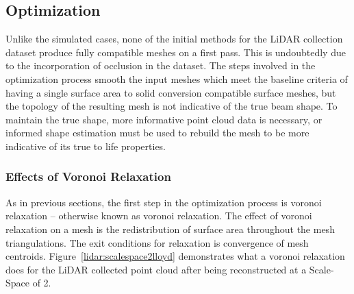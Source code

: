 \documentclass[12pt]{drexelthesis}
\let\Oldsubsection\subsection
\renewcommand{\subsection}{\FloatBarrier\Oldsubsection}
\let\Oldsubsubsection\subsubsection
\renewcommand{\subsubsection}{\FloatBarrier\Oldsubsubsection}
\begin{document}
\subsection{Optimization}

Unlike the simulated cases, none of the initial methods for the LiDAR collection dataset produce fully compatible meshes on a first pass. This is undoubtedly due to the incorporation of occlusion in the dataset. The steps involved in the optimization process smooth the input meshes which meet the baseline criteria of having a single surface area to solid conversion compatible surface meshes, but the topology of the resulting mesh is not indicative of the true beam shape. To maintain the true shape, more informative point cloud data is necessary, or informed shape estimation must be used to rebuild the mesh to be more indicative of its true to life properties.

\subsubsection{Effects of Voronoi Relaxation}

As in previous sections, the first step in the optimization process is voronoi relaxation -- otherwise known as voronoi relaxation. The effect of voronoi relaxation on a mesh is the redistribution of surface area throughout the mesh triangulations. The exit conditions for relaxation is convergence of mesh centroids. Figure~\ref{lidar:scalespace2lloyd} demonstrates what a voronoi relaxation does for the LiDAR collected point cloud after being reconstructed at a Scale-Space of 2.
\end{document}
